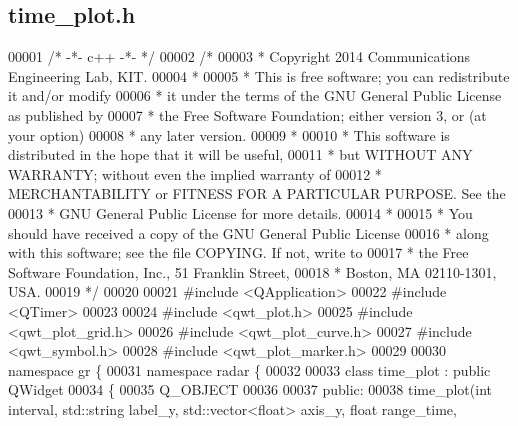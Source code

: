 \subsection{time\+\_\+plot.\+h}
\label{time__plot_8h_source}

\begin{DoxyCode}
00001 \textcolor{comment}{/* -*- c++ -*- */}
00002 \textcolor{comment}{/* }
00003 \textcolor{comment}{ * Copyright 2014 Communications Engineering Lab, KIT.}
00004 \textcolor{comment}{ * }
00005 \textcolor{comment}{ * This is free software; you can redistribute it and/or modify}
00006 \textcolor{comment}{ * it under the terms of the GNU General Public License as published by}
00007 \textcolor{comment}{ * the Free Software Foundation; either version 3, or (at your option)}
00008 \textcolor{comment}{ * any later version.}
00009 \textcolor{comment}{ * }
00010 \textcolor{comment}{ * This software is distributed in the hope that it will be useful,}
00011 \textcolor{comment}{ * but WITHOUT ANY WARRANTY; without even the implied warranty of}
00012 \textcolor{comment}{ * MERCHANTABILITY or FITNESS FOR A PARTICULAR PURPOSE.  See the}
00013 \textcolor{comment}{ * GNU General Public License for more details.}
00014 \textcolor{comment}{ * }
00015 \textcolor{comment}{ * You should have received a copy of the GNU General Public License}
00016 \textcolor{comment}{ * along with this software; see the file COPYING.  If not, write to}
00017 \textcolor{comment}{ * the Free Software Foundation, Inc., 51 Franklin Street,}
00018 \textcolor{comment}{ * Boston, MA 02110-1301, USA.}
00019 \textcolor{comment}{ */}
00020 
00021 \textcolor{preprocessor}{#include <QApplication>}
00022 \textcolor{preprocessor}{#include <QTimer>}
00023 
00024 \textcolor{preprocessor}{#include <qwt\_plot.h>}
00025 \textcolor{preprocessor}{#include <qwt\_plot\_grid.h>}
00026 \textcolor{preprocessor}{#include <qwt\_plot\_curve.h>}
00027 \textcolor{preprocessor}{#include <qwt\_symbol.h>}
00028 \textcolor{preprocessor}{#include <qwt\_plot\_marker.h>}
00029 
00030 \textcolor{keyword}{namespace }gr \{
00031     \textcolor{keyword}{namespace }radar \{
00032         
00033         \textcolor{keyword}{class }time_plot : \textcolor{keyword}{public} QWidget
00034         \{
00035         Q\_OBJECT
00036 
00037         \textcolor{keyword}{public}:
00038             time_plot(\textcolor{keywordtype}{int} interval, std::string label\_y, std::vector<float> axis\_y, \textcolor{keywordtype}{float} range\_time, 

\end{DoxyCode}
